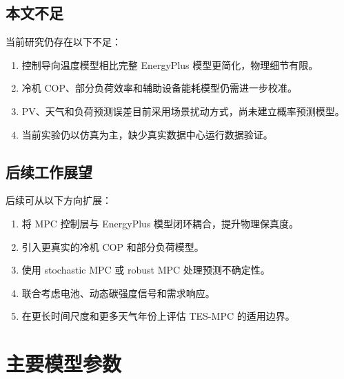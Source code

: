 \documentclass[UTF8,a4paper,12pt]{ctexrep}
\begin{document}
\section{本文不足}

当前研究仍存在以下不足：

\begin{enumerate}[label=(\arabic*)]
  \item 控制导向温度模型相比完整 EnergyPlus 模型更简化，物理细节有限。
  \item 冷机 COP、部分负荷效率和辅助设备能耗模型仍需进一步校准。
  \item PV、天气和负荷预测误差目前采用场景扰动方式，尚未建立概率预测模型。
  \item 当前实验仍以仿真为主，缺少真实数据中心运行数据验证。
\end{enumerate}

\section{后续工作展望}

后续可从以下方向扩展：

\begin{enumerate}[label=(\arabic*)]
  \item 将 MPC 控制层与 EnergyPlus 模型闭环耦合，提升物理保真度。
  \item 引入更真实的冷机 COP 和部分负荷模型。
  \item 使用 stochastic MPC 或 robust MPC 处理预测不确定性。
  \item 联合考虑电池、动态碳强度信号和需求响应。
  \item 在更长时间尺度和更多天气年份上评估 TES-MPC 的适用边界。
\end{enumerate}




\appendix

\chapter{主要模型参数}
\end{document}
